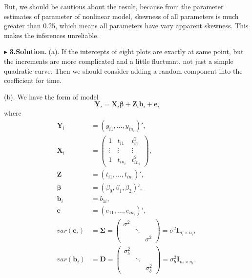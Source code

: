 \documentclass[letterpaper, 12pt]{article}
\newcommand{\ba}{$$\begin{aligned}}
\newcommand{\ea}{\end{aligned}$$}
\begin{document}
But, we should be cautious about the result, because from the parameter estimates of parameter of nonlinear model, skewness of all parameters is much greater than 0.25, which means all parameters have vary apparent skewness. This makes the inferences unreliable.


$\blacktriangleright$ \textbf{3.\quad Solution.} 
(a). If the intercepts of eight plots are exactly at same point, but the increments are more complicated and a little fluctuant, not just a simple quadratic curve. Then we should consider adding a random component into the coefficient for time.

(b). We have the form of model 
$$
\bm{Y}_i=\bm{X}_i\bm{\beta}+\bm{Z}_i\bm{b}_i+\bm{e}_i
$$
where 
\ba
\bm{Y}_i&=(y_{i1},\dots,y_{in_i})',\\
\bm{X}_i&=\left(\begin{matrix}
1&t_{i1}&t_{i1}^2\\
\vdots&\vdots&\vdots\\
1&t_{in_i}&t_{in_i}^2\end{matrix}\right),\\
\bm{Z}&=(t_{i1},\dots,t_{in_i})',\\
\bm{\beta}&=(\beta_0,\beta_1,\beta_2)',\\
\bm{b}_i&=b_{1i},\\
\bm{e}&=(e_{11},\dots,e_{in_i})',\\
var(\bm{e}_i)&=\bm{\Sigma}=\left(\begin{matrix}
\sigma^2\\
&\ddots\\
&&\sigma^2\end{matrix}\right)=\sigma^2\bm{I}_{n_i\times n_i},\\
var(\bm{b}_i)&=\bm{D}=\left(\begin{matrix}
\sigma_b^2\\
&\ddots\\
&&\sigma_b^2\end{matrix}\right)=\sigma_b^2\bm{I}_{n_i\times n_i},\\
\ea
\end{document}
